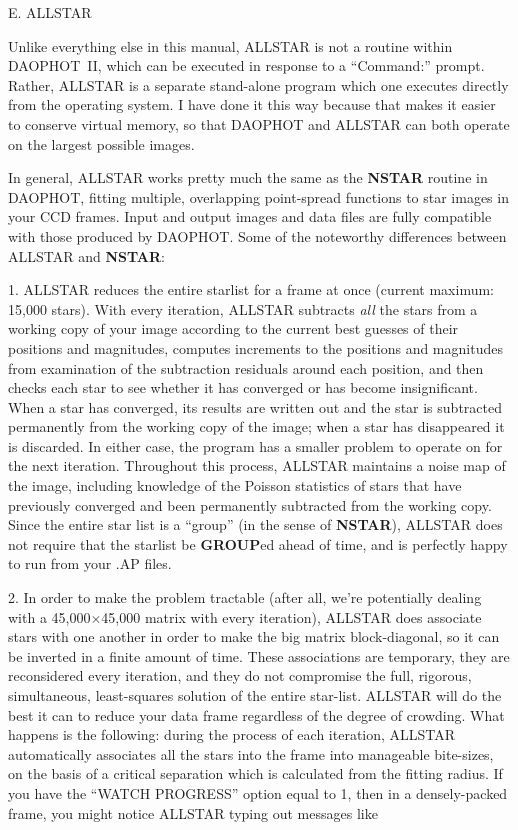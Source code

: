 \vfill
\eject
\centerline {E. ALLSTAR}

Unlike everything else in this manual, ALLSTAR is not a
routine within DAOPHOT~II, which can be executed in response to a
``Command:'' prompt.  Rather, ALLSTAR is a separate stand-alone
program which one executes directly from the operating system.  I
have done it this way because that makes it easier to conserve
virtual memory, so that DAOPHOT and ALLSTAR can both operate
on the largest possible images.

In general, ALLSTAR works pretty much the same as the {\bf NSTAR}
routine in DAOPHOT, fitting multiple, overlapping point-spread functions
to star images in your CCD frames.  Input and output images and data
files are fully compatible with those produced by DAOPHOT.  Some of
the noteworthy differences between ALLSTAR and {\bf NSTAR}:

\item{1.} ALLSTAR reduces the entire starlist for a frame at once
(current maximum: 15,000 stars).  With every iteration, ALLSTAR
subtracts {\it all\/} the stars from a working copy of your image
according to the current best guesses of their positions and
magnitudes, computes increments to the positions and magnitudes from
examination of the subtraction residuals around each position, and then
checks each star to see whether it has converged or has become
insignificant.  When a star has converged, its results are written out
and the star is subtracted permanently from the working copy of the
image; when a star has disappeared it is discarded.  In either case,
the program has a smaller problem to operate on for the next
iteration.  Throughout this process, ALLSTAR maintains a noise map of
the image, including knowledge of the Poisson statistics of stars that
have previously converged and been permanently subtracted from the
working copy.  Since the entire star list is a ``group'' (in the sense
of {\bf NSTAR}), ALLSTAR does not require that the starlist be {\bf
GROUP}ed ahead of time, and is perfectly happy to run from your
.AP files.

\item{2.} In order to make the problem tractable (after all, we're
potentially dealing with a 45,000$\times$45,000 matrix with every
iteration), ALLSTAR does associate stars with one another in
order to make the big matrix block-diagonal, so it can be inverted in a
finite amount of time.  These associations are temporary, they are
reconsidered every iteration, and they do not compromise the full,
rigorous, simultaneous, least-squares solution of the entire
star-list.  ALLSTAR will do the best it can to reduce your data
frame regardless of the degree of crowding.  What happens is the
following:  during the process of each iteration, ALLSTAR automatically
associates all the stars into the frame into manageable bite-sizes, on
the basis of a critical separation which is calculated from the fitting
radius.  If you have the ``WATCH PROGRESS'' option equal to 1, then in
a densely-packed frame, you might notice ALLSTAR typing out messages
like

